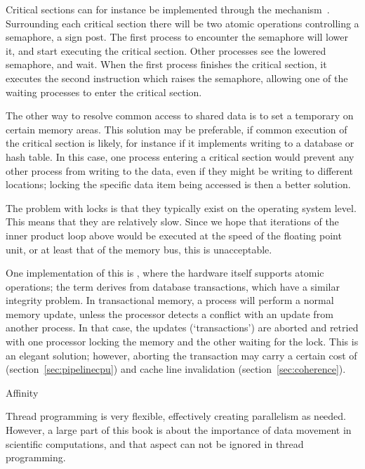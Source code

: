 Critical sections can for instance be implemented through the 
mechanism~\cite{Dijkstra:semaphores}. Surrounding each critical
section there will be two atomic operations controlling a semaphore, a
sign post.
The first process to encounter the semaphore will lower it, and start
executing the critical section. Other processes see the lowered
semaphore, and wait. When the first process finishes the critical
section, it executes the second instruction which raises the
semaphore, allowing one of the waiting processes to enter the critical
section.

The other way to resolve common access to shared data is to set a 
temporary  on certain memory areas. This solution may
be preferable, if common execution of the critical section is likely,
for instance if it implements writing to a database or hash table. In
this case, one process entering a
critical section would prevent any other process from writing
to the data, even if they might be writing to different locations;
locking the specific data item being accessed is then a better
solution.

The problem with locks is that they typically exist on the operating
system level. This means that they are relatively slow. Since we hope that
iterations of the inner product loop above would be executed at the
speed of the floating point unit, or at least that of the memory bus,
this is unacceptable.

One implementation of
this is , where the hardware itself
supports atomic operations; the term derives from database
transactions, which have a similar integrity problem. In transactional
memory, a process will perform a normal memory update, unless the
processor detects a conflict with an update from another process. In
that case, the updates (`transactions') are aborted and retried with
one processor locking the memory and the other waiting for the
lock. This is an elegant solution; however, aborting the transaction
may carry a certain cost of 
(section~\ref{sec:pipelinecpu}) and
cache line invalidation (section~\ref{sec:coherence}).


 {Affinity}

Thread programming is very flexible, effectively creating parallelism
as needed. However, a large part of this book is about the importance
of data movement in scientific computations, and that aspect can not
be ignored in thread programming.


